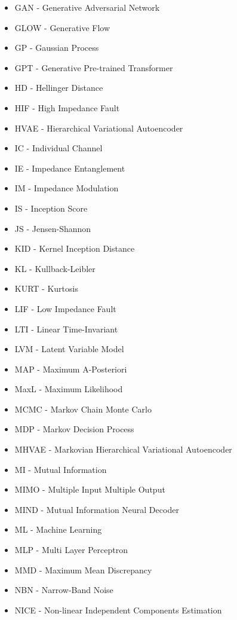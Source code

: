 \begin{multicols}{2}
\begin{itemize}
		\item GAN - Generative Adversarial Network
            \item GLOW - Generative Flow
            \item GP - Gaussian Process
            \item GPT - Generative Pre-trained Transformer
            \item HD - Hellinger Distance
            \item HIF - High Impedance Fault
            \item HVAE - Hierarchical Variational Autoencoder
            \item IC - Individual Channel
            \item IE - Impedance Entanglement
            \item IM - Impedance Modulation
            \item IS - Inception Score
            \item JS - Jensen-Shannon
            \item KID - Kernel Inception Distance
            \item KL - Kullback-Leibler
            \item KURT - Kurtosis
            \item LIF - Low Impedance Fault
            \item LTI - Linear Time-Invariant
            \item LVM - Latent Variable Model
            \item MAP - Maximum A-Posteriori
  		\item MaxL - Maximum Likelihood
            \item MCMC - Markov Chain Monte Carlo
            \item MDP - Markov Decision Process
            \item MHVAE - Markovian Hierarchical Variational Autoencoder
		\item MI - Mutual Information
		\item MIMO - Multiple Input Multiple Output
            \item MIND - Mutual Information Neural Decoder
  		\item ML - Machine Learning
            \item MLP - Multi Layer Perceptron
            \item MMD - Maximum Mean Discrepancy
            \item NBN - Narrow-Band Noise
            \item NICE - Non-linear Independent Components Estimation

\end{itemize}
\end{multicols}
